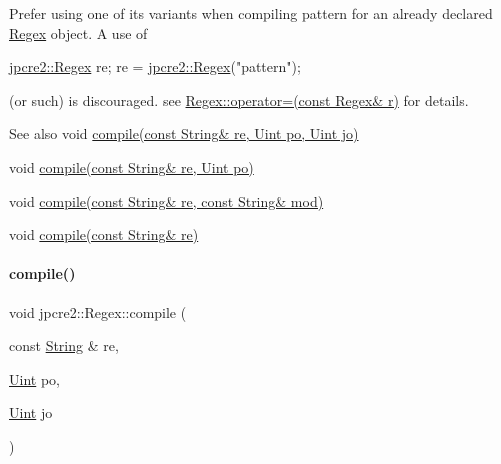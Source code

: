 Prefer using one of its variants when compiling pattern for an already declared \hyperlink{classjpcre2_1_1Regex}{Regex} object. A use of 
\begin{DoxyCode}
\hyperlink{classjpcre2_1_1Regex}{jpcre2::Regex} re;
re = \hyperlink{classjpcre2_1_1Regex}{jpcre2::Regex}(\textcolor{stringliteral}{"pattern"});
\end{DoxyCode}
 (or such) is discouraged. see {\ttfamily \hyperlink{classjpcre2_1_1Regex_ab43a14b4b6e75b7fa3221bc18a1d4121_ab43a14b4b6e75b7fa3221bc18a1d4121}{Regex\+::operator=(const Regex\& r)}} for details. \begin{DoxySeeAlso}{See also}
void \hyperlink{classjpcre2_1_1Regex_a4640915bc907aa3b80da543f1eb7e74f_a4640915bc907aa3b80da543f1eb7e74f}{compile(const String\& re, Uint po, Uint jo)} 

void \hyperlink{classjpcre2_1_1Regex_a01394dcb222c4d442cabbffb4bcf570a_a01394dcb222c4d442cabbffb4bcf570a}{compile(const String\& re, Uint po)} 

void \hyperlink{classjpcre2_1_1Regex_acd49e856009160c622e90b81b6557d8d_acd49e856009160c622e90b81b6557d8d}{compile(const String\& re, const String\& mod)} 

void \hyperlink{classjpcre2_1_1Regex_a81687ca434654cae776c2854c3618de0_a81687ca434654cae776c2854c3618de0}{compile(const String\& re)} 
\end{DoxySeeAlso}
\hypertarget{classjpcre2_1_1Regex_a4640915bc907aa3b80da543f1eb7e74f_a4640915bc907aa3b80da543f1eb7e74f}{}\label{classjpcre2_1_1Regex_a4640915bc907aa3b80da543f1eb7e74f_a4640915bc907aa3b80da543f1eb7e74f} 
\paragraph{\texorpdfstring{compile()}{compile()}\hspace{0.1cm}{\footnotesize\ttfamily [2/5]}}
{\footnotesize\ttfamily void jpcre2\+::\+Regex\+::compile (\begin{DoxyParamCaption}\item[{const \hyperlink{namespacejpcre2_a91f03070152fb228bc116c5a737f1d16}{String} \&}]{re,  }\item[{\hyperlink{namespacejpcre2_a078242d38221a13fb3543b9edd78c099}{Uint}}]{po,  }\item[{\hyperlink{namespacejpcre2_a078242d38221a13fb3543b9edd78c099}{Uint}}]{jo }\end{DoxyParamCaption})\hspace{0.3cm}{\ttfamily [inline]}}



